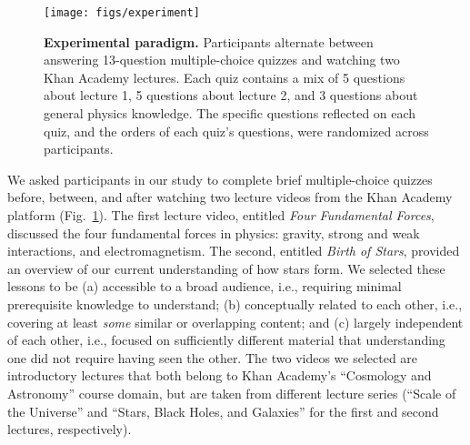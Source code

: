 \documentclass[10pt]{article}
\newcommand{\questions}{S1}
\begin{document}
\begin{figure}[tp]
    \centering
    \texttt{[image: figs/experiment]}

    \caption{\textbf{Experimental paradigm.} Participants alternate between
    answering 13-question multiple-choice quizzes and watching two Khan Academy
    lectures. Each quiz contains a mix of 5 questions about lecture 1, 5
    questions about lecture 2, and 3 questions about general physics knowledge. The
    specific questions reflected on each quiz, and the orders of each quiz's
    questions, were randomized across participants.}

    \label{fig:experiment}
\end{figure}

We asked participants in our study to complete brief multiple-choice quizzes before, between, and after watching two lecture videos from the Khan Academy \citep{Khan04} platform (Fig.~\ref{fig:experiment}). The first lecture video, entitled \textit{Four
Fundamental Forces}, discussed the four fundamental forces in physics: gravity,
strong and weak interactions, and electromagnetism. The second,
entitled \textit{Birth of Stars}, provided an overview of our current
understanding of how stars form.
%
We selected these lessons to be (a) accessible
to a broad audience, i.e., requiring minimal prerequisite knowledge to understand;
(b) conceptually related to each other, i.e., covering at least \textit{some}
similar or overlapping content; and (c) largely independent of each other, i.e., focused
on sufficiently different material that understanding one did not require having seen
the other. The two videos we selected are introductory lectures that both
belong to Khan Academy's ``Cosmology and Astronomy'' course domain, but are taken from
different lecture series (``Scale of the Universe'' and ``Stars, Black Holes, and Galaxies''
for the first and second lectures, respectively).
\end{document}

